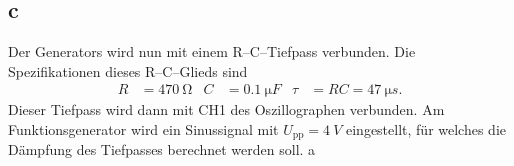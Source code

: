 \documentclass[a4paper,10pt]{article}
\numberwithin{equation}{section}
\begin{document}
\subsection{c}
Der Generators wird nun mit einem R--C--Tiefpass verbunden.
Die Spezifikationen dieses R--C--Glieds sind
\begin{align} 
        R &= \SI{470}{\ohm} & C &= \SI{0.1}{\micro F} & \tau &= RC = \SI{47}{\micro s}
.\end{align} 
Dieser Tiefpass wird dann mit CH1 des Oszillographen verbunden.
Am Funktionsgenerator wird ein Sinussignal mit $U_\text{pp}=\SI{4}{V}$ eingestellt, für welches die Dämpfung des Tiefpasses berechnet werden soll. a

\clearpage
\listoffigures
\listoftables




\end{document}
